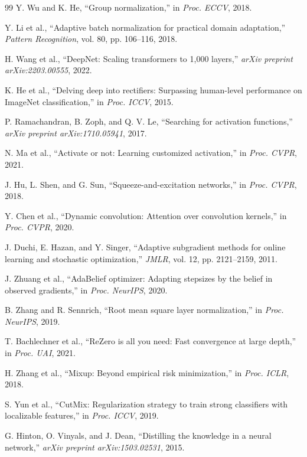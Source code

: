\documentclass[final,3p,times,twocolumn]{elsarticle}
\begin{document}
\begin{thebibliography}{99}
Y. Wu and K. He, ``Group normalization,'' in \textit{Proc. ECCV}, 2018.

Y. Li et al., ``Adaptive batch normalization for practical domain
adaptation,'' \textit{Pattern Recognition}, vol. 80, pp. 106--116,
2018.

H. Wang et al., ``DeepNet: Scaling transformers to 1,000 layers,''
\textit{arXiv preprint arXiv:2203.00555}, 2022.

K. He et al., ``Delving deep into rectifiers: Surpassing human-level
performance on ImageNet classification,'' in \textit{Proc. ICCV}, 2015.

P. Ramachandran, B. Zoph, and Q. V. Le, ``Searching for activation
functions,'' \textit{arXiv preprint arXiv:1710.05941}, 2017.

N. Ma et al., ``Activate or not: Learning customized activation,'' in
\textit{Proc. CVPR}, 2021.

J. Hu, L. Shen, and G. Sun, ``Squeeze-and-excitation networks,'' in
\textit{Proc. CVPR}, 2018.

Y. Chen et al., ``Dynamic convolution: Attention over convolution
kernels,'' in \textit{Proc. CVPR}, 2020.

J. Duchi, E. Hazan, and Y. Singer, ``Adaptive subgradient methods for
online learning and stochastic optimization,'' \textit{JMLR}, vol. 12,
pp. 2121--2159, 2011.

J. Zhuang et al., ``AdaBelief optimizer: Adapting stepsizes by the
belief in observed gradients,'' in \textit{Proc. NeurIPS}, 2020.

B. Zhang and R. Sennrich, ``Root mean square layer normalization,'' in
\textit{Proc. NeurIPS}, 2019.

T. Bachlechner et al., ``ReZero is all you need: Fast convergence at
large depth,'' in \textit{Proc. UAI}, 2021.

H. Zhang et al., ``Mixup: Beyond empirical risk minimization,'' in
\textit{Proc. ICLR}, 2018.

S. Yun et al., ``CutMix: Regularization strategy to train strong
classifiers with localizable features,'' in \textit{Proc. ICCV}, 2019.

G. Hinton, O. Vinyals, and J. Dean, ``Distilling the knowledge in a
neural network,'' \textit{arXiv preprint arXiv:1503.02531}, 2015.


\end{thebibliography}
\end{document}
